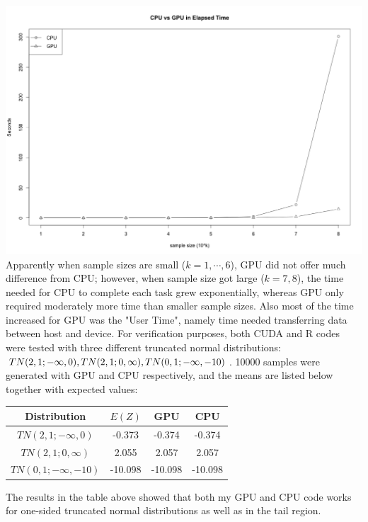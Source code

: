\documentclass[12pt]{article}
\begin{document}
\includegraphics[width=\textwidth]{cpuvsgpuet.png}\newline
Apparently when sample sizes are small ($k = 1, \cdots, 6$), GPU did not offer much difference from CPU; however, when sample size got large ($k = 7, 8$), the time needed for CPU to complete each task grew exponentially, whereas GPU only required moderately more time than smaller sample sizes. Also most of the time increased for GPU was the "User Time", namely time needed transferring data between host and device.\newline
For verification purposes, both CUDA and R codes were tested with three different truncated normal distributions: $TN(2, 1; -\infty, 0), TN(2, 1; 0, \infty), \newline TN(0, 1; -\infty, -10)$. 10000 samples were generated with GPU and CPU respectively, and the means are listed below together with expected values:
\begin{center}
	\begin{tabular}{|c|c|c|c|}
	\hline
	Distribution & $E(Z)$ & GPU & CPU \\
	\hline
	$TN(2, 1; -\infty, 0)$ & -0.373 & -0.374 & -0.374 \\
	\hline
	$TN(2, 1; 0, \infty)$ & 2.055 & 2.057 & 2.057 \\
	\hline
	$TN(0, 1; -\infty, -10)$ & -10.098 & -10.098 & -10.098 \\
	\hline	
	\end{tabular}
\end{center}
The results in the table above showed that both my GPU and CPU code works for one-sided truncated normal distributions as well as in the tail region.
\newline \newline
\end{document}
